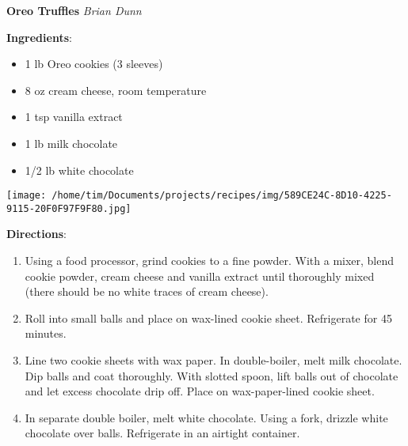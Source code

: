 \documentclass[11pt, twoside, openany]{book}
\begin{document}
\noindent\begin{minipage}[t]{\linewidth}%
{\Large\textbf{Oreo Truffles}} \label{oreo-truffles}\hfill\textit{Brian Dunn}\\
\noindent\begin{minipage}[t]{0.78\linewidth}%
\textbf{Ingredients}:\vspace{-3mm}
\begin{multicols}{2}
\begin{itemize}\setlength\itemsep{-1mm}
\item 1 lb Oreo cookies (3 sleeves)
\item 8 oz cream cheese, room temperature
\item 1 tsp vanilla extract
\item 1 lb milk chocolate
\item 1/2 lb white chocolate
\end{itemize}
\end{multicols}
\end{minipage}
\noindent\begin{minipage}[t]{0.18\linewidth}
\centering \strut\vspace*{-\baselineskip}\newline
\texttt{[image: /home/tim/Documents/projects/recipes/img/589CE24C-8D10-4225-9115-20F0F97F9F80.jpg]}\\
\end{minipage}\vspace{3mm}
\textbf{Directions}:
\vspace{-3mm}\begin{enumerate}\setlength\itemsep{-1mm}
\item Using a food processor, grind cookies to a fine powder. With a mixer, blend cookie powder, cream cheese and vanilla extract until thoroughly mixed (there should be no white traces of cream cheese).
\item Roll into small balls and place on wax-lined cookie sheet. Refrigerate for 45 minutes.
\item Line two cookie sheets with wax paper. In double-boiler, melt milk chocolate. Dip balls and coat thoroughly. With slotted spoon, lift balls out of chocolate and let excess chocolate drip off. Place on wax-paper-lined cookie sheet.
\item In separate double boiler, melt white chocolate. Using a fork, drizzle white chocolate over balls. Refrigerate in an airtight container.
\end{enumerate}
\end{minipage}\vspace{8mm}
\end{document}
